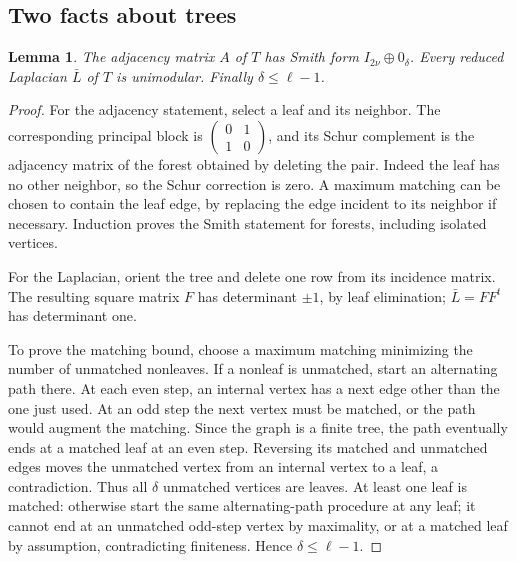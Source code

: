\documentclass[11pt,a4paper]{article}
\newtheorem{lemma}[theorem]{Lemma}
\theoremstyle{definition}\newtheorem{definition}[theorem]{Definition}
\theoremstyle{remark}\newtheorem{remark}[theorem]{Remark}
\numberwithin{equation}{section}
\begin{document}
\subsection{Two facts about trees}\label{K04-sec-3}
\begin{lemma}\label{K04-treefacts}
The adjacency matrix $A$ of $T$ has Smith form $I_{2\nu}\oplus0_\delta$. Every reduced Laplacian $\bar L$ of $T$ is unimodular. Finally $\delta\leq\ell-1$.
\end{lemma}
\begin{proof}
For the adjacency statement, select a leaf and its neighbor. The corresponding principal block is $\left(\begin{smallmatrix}0&1\\1&0\end{smallmatrix}\right)$, and its Schur complement is the adjacency matrix of the forest obtained by deleting the pair. Indeed the leaf has no other neighbor, so the Schur correction is zero. A maximum matching can be chosen to contain the leaf edge, by replacing the edge incident to its neighbor if necessary. Induction proves the Smith statement for forests, including isolated vertices.

For the Laplacian, orient the tree and delete one row from its incidence matrix. The resulting square matrix $F$ has determinant $\pm1$, by leaf elimination; $\bar L=FF^t$ has determinant one.

To prove the matching bound, choose a maximum matching minimizing the number of unmatched nonleaves. If a nonleaf is unmatched, start an alternating path there. At each even step, an internal vertex has a next edge other than the one just used. At an odd step the next vertex must be matched, or the path would augment the matching. Since the graph is a finite tree, the path eventually ends at a matched leaf at an even step. Reversing its matched and unmatched edges moves the unmatched vertex from an internal vertex to a leaf, a contradiction. Thus all $\delta$ unmatched vertices are leaves. At least one leaf is matched: otherwise start the same alternating-path procedure at any leaf; it cannot end at an unmatched odd-step vertex by maximality, or at a matched leaf by assumption, contradicting finiteness. Hence $\delta\leq\ell-1$.
\end{proof}
\end{document}
